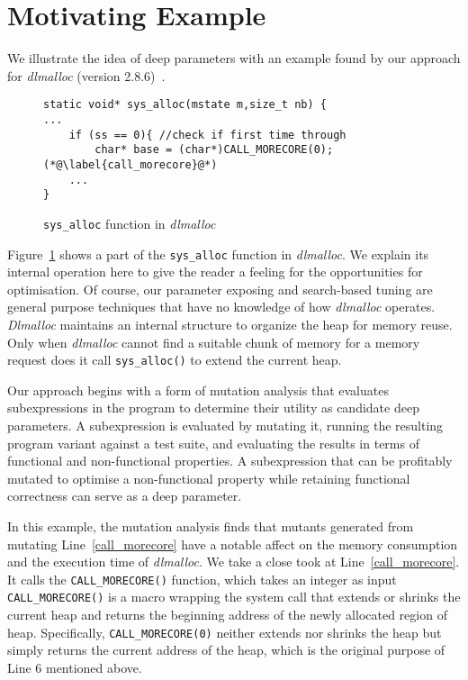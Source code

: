 
\section{Motivating Example}

We illustrate the idea of deep parameters with an example found by our approach for \emph{dlmalloc} (version 2.8.6)~\cite{lea1996memory}.

\begin{figure}[ht]
\begin{lstlisting}
static void* sys_alloc(mstate m,size_t nb) {
...
	if (ss == 0){ //check if first time through
		char* base = (char*)CALL_MORECORE(0); (*@\label{call_morecore}@*)
	...
}
\end{lstlisting}
\vspace{-1.5em}
\caption{{\tt sys\_alloc} function in \emph{dlmalloc}}
\label{exp}
\end{figure}

Figure~\ref{exp} shows a part of the {\tt sys\_alloc} function in \emph{dlmalloc}. We explain its internal operation here to give the reader a feeling for the opportunities for optimisation. Of course, our parameter exposing and search-based tuning are general purpose techniques that have no knowledge of how \emph{dlmalloc} operates. \emph{Dlmalloc} maintains an internal structure to organize the heap for memory reuse. Only when \emph{dlmalloc} cannot find a suitable chunk of memory for a memory request does it call {\tt sys\_alloc()} to extend the current heap.



Our approach begins with a form of mutation analysis that evaluates
subexpressions in the program to determine their utility as candidate
deep parameters. A subexpression is evaluated by mutating it, running
the resulting program variant against a test suite, and evaluating the
results in terms of functional and non-functional properties. A
subexpression that can be profitably mutated to optimise a non-functional
property while retaining functional correctness can serve as a deep
parameter.  

In this example, the mutation analysis finds that mutants generated from mutating Line~\ref{call_morecore} have a notable affect on the memory consumption and the execution time of \emph{dlmalloc}. We take a close took at Line~\ref{call_morecore}. It calls the {\tt CALL\_MORECORE()} function, which takes an integer as input
{\tt CALL\_MORECORE()} is a macro wrapping the system call that extends or shrinks the current heap and returns the beginning address of the newly allocated region of heap. Specifically, {\tt CALL\_MORECORE(0)} neither extends nor shrinks the heap but simply returns the current address of the heap, which is the original purpose of Line 6 mentioned above.

